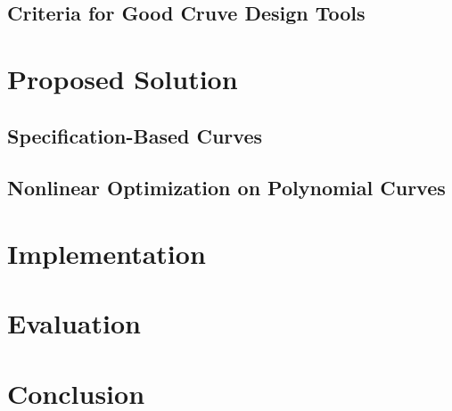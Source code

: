 \documentclass[a4paper]{article}
\begin{document}
		\subsection{Criteria for Good Cruve Design Tools}


	\section{Proposed Solution}

		\subsection{Specification-Based Curves}


		\subsection{Nonlinear Optimization on Polynomial Curves}


	\section{Implementation}

	\section{Evaluation}

	\section{Conclusion}
\end{document}
